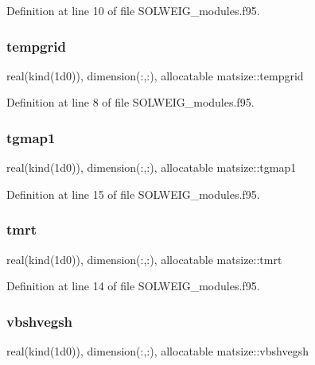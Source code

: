 Definition at line 10 of file S\+O\+L\+W\+E\+I\+G\+\_\+modules.\+f95.

\mbox{\label{namespacematsize_aabcb952c227c31fd4f5f61afd2fd52cd}} 
\subsubsection{\texorpdfstring{tempgrid}{tempgrid}}
{\footnotesize\ttfamily real(kind(1d0)), dimension(\+:,\+:), allocatable matsize\+::tempgrid}



Definition at line 8 of file S\+O\+L\+W\+E\+I\+G\+\_\+modules.\+f95.

\mbox{\label{namespacematsize_a86f180bc19d9a733d20cd41559fc9c15}} 
\subsubsection{\texorpdfstring{tgmap1}{tgmap1}}
{\footnotesize\ttfamily real(kind(1d0)), dimension(\+:,\+:), allocatable matsize\+::tgmap1}



Definition at line 15 of file S\+O\+L\+W\+E\+I\+G\+\_\+modules.\+f95.

\mbox{\label{namespacematsize_a9154a4703b2d439f695e33201e46f231}} 
\subsubsection{\texorpdfstring{tmrt}{tmrt}}
{\footnotesize\ttfamily real(kind(1d0)), dimension(\+:,\+:), allocatable matsize\+::tmrt}



Definition at line 14 of file S\+O\+L\+W\+E\+I\+G\+\_\+modules.\+f95.

\mbox{\label{namespacematsize_a9f51b3ddaf5ee62ef1f8ded44384e64a}} 
\subsubsection{\texorpdfstring{vbshvegsh}{vbshvegsh}}
{\footnotesize\ttfamily real(kind(1d0)), dimension(\+:,\+:), allocatable matsize\+::vbshvegsh}



